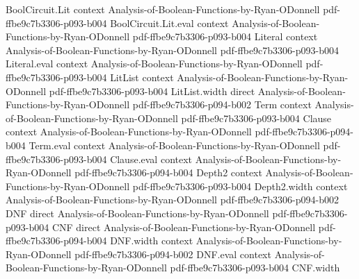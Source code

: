 \begin{theorem}
\label{BooleanAnalysis.parseval}
\leanok
{}
\proofstep
  {BoolCircuit.Lit}
  {context}
  {Analysis-of-Boolean-Functions-by-Ryan-ODonnell}
  {pdf-ffbe9c7b3306-p093-b004}
\proofstep
  {BoolCircuit.Lit.eval}
  {context}
  {Analysis-of-Boolean-Functions-by-Ryan-ODonnell}
  {pdf-ffbe9c7b3306-p093-b004}
\proofstep
  {Literal}
  {context}
  {Analysis-of-Boolean-Functions-by-Ryan-ODonnell}
  {pdf-ffbe9c7b3306-p093-b004}
\proofstep
  {Literal.eval}
  {context}
  {Analysis-of-Boolean-Functions-by-Ryan-ODonnell}
  {pdf-ffbe9c7b3306-p093-b004}
\proofstep
  {LitList}
  {context}
  {Analysis-of-Boolean-Functions-by-Ryan-ODonnell}
  {pdf-ffbe9c7b3306-p093-b004}
\proofstep
  {LitList.width}
  {direct}
  {Analysis-of-Boolean-Functions-by-Ryan-ODonnell}
  {pdf-ffbe9c7b3306-p094-b002}
\proofstep
  {Term}
  {context}
  {Analysis-of-Boolean-Functions-by-Ryan-ODonnell}
  {pdf-ffbe9c7b3306-p093-b004}
\proofstep
  {Clause}
  {context}
  {Analysis-of-Boolean-Functions-by-Ryan-ODonnell}
  {pdf-ffbe9c7b3306-p094-b004}
\proofstep
  {Term.eval}
  {context}
  {Analysis-of-Boolean-Functions-by-Ryan-ODonnell}
  {pdf-ffbe9c7b3306-p093-b004}
\proofstep
  {Clause.eval}
  {context}
  {Analysis-of-Boolean-Functions-by-Ryan-ODonnell}
  {pdf-ffbe9c7b3306-p094-b004}
\proofstep
  {Depth2}
  {context}
  {Analysis-of-Boolean-Functions-by-Ryan-ODonnell}
  {pdf-ffbe9c7b3306-p093-b004}
\proofstep
  {Depth2.width}
  {context}
  {Analysis-of-Boolean-Functions-by-Ryan-ODonnell}
  {pdf-ffbe9c7b3306-p094-b002}
\proofstep
  {DNF}
  {direct}
  {Analysis-of-Boolean-Functions-by-Ryan-ODonnell}
  {pdf-ffbe9c7b3306-p093-b004}
\proofstep
  {CNF}
  {direct}
  {Analysis-of-Boolean-Functions-by-Ryan-ODonnell}
  {pdf-ffbe9c7b3306-p094-b004}
\proofstep
  {DNF.width}
  {context}
  {Analysis-of-Boolean-Functions-by-Ryan-ODonnell}
  {pdf-ffbe9c7b3306-p094-b002}
\proofstep
  {DNF.eval}
  {context}
  {Analysis-of-Boolean-Functions-by-Ryan-ODonnell}
  {pdf-ffbe9c7b3306-p093-b004}
\proofstep
  {CNF.width}

\end{theorem}
